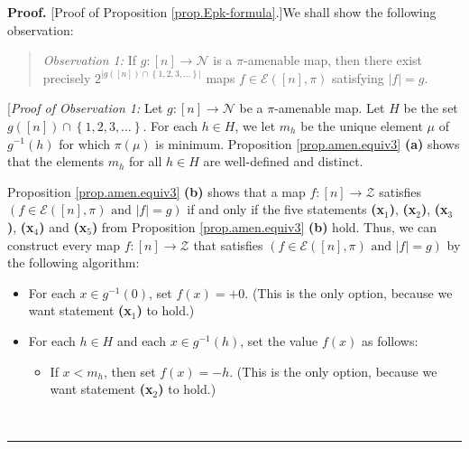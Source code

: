 \documentclass[numbers=enddot,12pt,final,onecolumn,notitlepage]{scrartcl}%
\theoremstyle{definition}
\newenvironment{statement}{\begin{quote}}{\end{quote}}
\newenvironment{proof}[1][Proof]{\noindent\textbf{#1.} }{\ \rule{0.5em}{0.5em}}
\newenvironment{verlong}{}{}
\begin{document}
\begin{verlong}
\begin{proof}
[Proof of Proposition \ref{prop.Epk-formula}.]We shall show the following observation:

\begin{statement}
\textit{Observation 1:} If $g:\left[  n\right]  \rightarrow\mathcal{N}$ is a
$\pi$-amenable map, then there exist precisely $2^{\left\vert g\left(  \left[
n\right]  \right)  \cap\left\{  1,2,3,\ldots\right\}  \right\vert }$ maps
$f\in\mathcal{E}\left(  \left[  n\right]  ,\pi\right)  $ satisfying
$\left\vert f\right\vert =g$.
\end{statement}

[\textit{Proof of Observation 1:} Let $g:\left[  n\right]  \rightarrow
\mathcal{N}$ be a $\pi$-amenable map. Let $H$ be the set $g\left(  \left[
n\right]  \right)  \cap\left\{  1,2,3,\ldots\right\}  $. For each $h\in H$, we
let $m_{h}$ be the unique element $\mu$ of $g^{-1}\left(  h\right)  $ for
which $\pi\left(  \mu\right)  $ is minimum. Proposition \ref{prop.amen.equiv3}
\textbf{(a)} shows that the elements $m_{h}$ for all $h\in H$ are well-defined
and distinct.

Proposition \ref{prop.amen.equiv3} \textbf{(b)} shows that a map $f:\left[
n\right]  \rightarrow\mathcal{Z}$ satisfies \newline
$\left(  f\in\mathcal{E}\left(
\left[  n\right]  ,\pi\right)  \text{ and }\left\vert f\right\vert =g\right)
$ if and only if the five statements \textbf{(x}$_{1}$\textbf{)},
\textbf{(x}$_{2}$\textbf{)}, \textbf{(x}$_{3}$\textbf{)}, \textbf{(x}$_{4}%
$\textbf{)} and \textbf{(x}$_{5}$\textbf{)} from Proposition
\ref{prop.amen.equiv3} \textbf{(b)} hold. Thus, we can construct every map
$f:\left[  n\right]  \rightarrow\mathcal{Z}$ that satisfies $\left(
f\in\mathcal{E}\left(  \left[  n\right]  ,\pi\right)  \text{ and }\left\vert
f\right\vert =g\right)  $ by the following algorithm:

\begin{itemize}
\item[\textbf{Step 1:}] For each $x\in g^{-1}\left(  0\right)  $, set
$f\left(  x\right)  =+0$. (This is the only option, because we want statement
\textbf{(x}$_{1}$\textbf{)} to hold.)

\item[\textbf{Step 2:}] For each $h\in H$ and each $x\in g^{-1}\left(
h\right)  $, set the value $f\left(  x\right)  $ as follows:

\begin{itemize}
\item If $x<m_{h}$, then set $f\left(  x\right)  =-h$. (This is the only
option, because we want statement \textbf{(x}$_{2}$\textbf{)} to hold.)


\end{itemize}
\end{itemize}
\end{proof}
\end{verlong}
\end{document}
